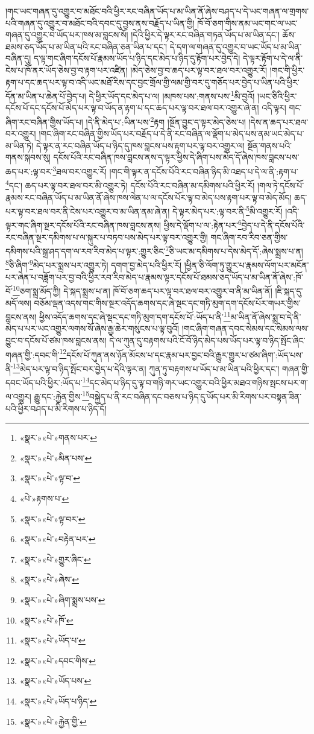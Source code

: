 །གང་ཡང་གཞན་དུ་འགྱུར་བ་མཐོང་བའི་ཕྱིར་རང་བཞིན་ཡོད་པ་མ་ཡིན་ནོ་ཞེས་བཤད་པ་དེ་ཡང་གཞན་ལ་གྲགས་པའི་གཞན་དུ་འགྱུར་བ་མཐོང་བའི་དབང་དུ་བྱས་ནས་བརྗོད་པ་ཡིན་གྱི། ཁོ་བོ་ཅག་གིས་ནམ་ཡང་གང་ལ་ཡང་གཞན་དུ་འགྱུར་བ་ཡོད་པར་ཁས་མ་བླངས་སོ། །དེའི་ཕྱིར་དེ་ལྟར་རང་བཞིན་གཏན་ཡོད་པ་མ་ཡིན་དང་། ཆོས་ཐམས་ཅད་ཡོད་པ་མ་ཡིན་པའི་རང་བཞིན་ཅན་ཡིན་པ་དང་། དེ་དག་ལ་གཞན་དུ་འགྱུར་བ་ཡང་ཡོད་པ་མ་ཡིན་བཞིན་དུ། ད་ལྟ་གང་ཞིག་དངོས་པོ་རྣམས་ཡོད་པ་ཉིད་དང་མེད་པ་ཉིད་དུ་རྟོག་པར་བྱེད་དེ། དེ་ལྟར་རྟོག་པ་དེ་ལ་ནི་ངེས་པ་ཁོ་ནར་ཡོད་ཅེས་བྱ་བ་རྟག་པར་འཛིན། །མེད་ཅེས་བྱ་བ་ཆད་པར་ལྟ་བར་ཐལ་བར་འགྱུར་རོ། །གང་གི་ཕྱིར་རྟག་པ་དང་ཆད་པར་ལྟ་བ་འདི་ཡང་མཐོ་རིས་དང་བྱང་གྲོལ་གྱི་ལམ་གྱི་བར་དུ་གཅོད་པར་བྱེད་པ་ཡིན་པའི་ཕྱིར་དོན་མ་ཡིན་པ་ཆེན་པོ་བྱེད་པ། དེ་ཕྱིར་ཡོད་དང་མེད་པ་ལ། །མཁས་པས་:གནས་པས་\footnote{«སྣར་»«པེ་»གནས་པར་}མི་བྱའོ། །ཡང་ཅིའི་ཕྱིར་དངོས་པོ་དང་དངོས་པོ་མེད་པར་ལྟ་བ་ཡོད་ན་རྟག་པ་དང་ཆད་པར་ལྟ་བར་ཐལ་བར་འགྱུར་ཞེ་ན། འདི་ལྟར། གང་ཞིག་རང་བཞིན་གྱིས་ཡོད་པ། །དེ་ནི་མེད་པ་:ཡིན་པས་\footnote{«སྣར་»«པེ་»མིན་པས་}རྟག །སྔོན་བྱུང་ད་ལྟར་མེད་ཅེས་པ། །དེས་ན་ཆད་པར་ཐལ་བར་འགྱུར། །གང་ཞིག་རང་བཞིན་གྱིས་ཡོད་པར་བརྗོད་པ་དེ་ནི་རང་བཞིན་ལ་ལྡོག་པ་མེད་པས་ནམ་ཡང་མེད་པ་མ་ཡིན་ཏེ། དེ་ལྟར་ན་རང་བཞིན་ཡོད་པ་ཉིད་དུ་ཁས་བླངས་པས་རྟག་པར་ལྟ་བར་འགྱུར་ལ། སྔོན་གནས་པའི་གནས་སྐབས་སུ། དངོས་པོའི་རང་བཞིན་ཁས་བླངས་ནས་ད་ལྟར་ཕྱིས་དེ་ཞིག་པས་མེད་དོ་ཞེས་ཁས་བླངས་པས་ཆད་པར་:ལྟ་བར་\footnote{«སྣར་»«པེ་»ལྟ་བ་}ཐལ་བར་འགྱུར་རོ། །གང་གི་ལྟར་ན་དངོས་པོའི་རང་བཞིན་ཉིད་མི་འཐད་པ་དེ་ལ་ནི་:རྟག་པ་\footnote{«པེ་»རྟགས་པ་}དང་། ཆད་པར་ལྟ་བར་ཐལ་བར་མི་འགྱུར་ཏེ། དངོས་པོའི་རང་བཞིན་མ་དམིགས་པའི་ཕྱིར་རོ། །གལ་ཏེ་དངོས་པོ་རྣམས་རང་བཞིན་ཡོད་པ་མ་ཡིན་ནོ་ཞེས་ཁས་ལེན་པ་ལ་དངོས་པོར་ལྟ་བ་མེད་པས་རྟག་པར་ལྟ་བ་མེད་མོད། ཆད་པར་ལྟ་བར་ཐལ་བར་ནི་ངེས་པར་འགྱུར་བ་མ་ཡིན་ནམ་ཞེ་ན། དེ་ལྟར་མེད་པར་:ལྟ་བར་ནི་\footnote{«སྣར་»«པེ་»ལྟ་བར་}མི་འགྱུར་རོ། །འདི་ལྟར་གང་ཞིག་སྔར་དངོས་པོའི་རང་བཞིན་ཁས་བླངས་ནས། ཕྱིས་དེ་ལྡོག་པ་ལ་:རྟེན་པར་\footnote{«སྣར་»«པེ་»བརྟེན་པར་}བྱེད་པ་དེ་ནི་དངོས་པོའི་རང་བཞིན་སྔར་དམིགས་པ་ལ་སྐུར་པ་བཏབ་པས་མེད་པར་ལྟ་བར་འགྱུར་གྱི། གང་ཞིག་རབ་རིབ་ཅན་གྱིས་དམིགས་པའི་སྐྲ་ཤད་དག་ལ་རབ་རིབ་མེད་པ་ལྟར་:གྱུར་ཅིང་\footnote{«སྣར་»«པེ་»གྱུར་ཞིང་}ཅི་ཡང་མ་དམིགས་པ་དེས་མེད་དོ་:ཞེས་སྨྲས་པ་ན། \footnote{«སྣར་»«པེ་»ཞེས་}ཅི་ཞིག་\footnote{«སྣར་»«པེ་»ཞིག་སྨྲས་པས་}མེད་པར་སྨྲས་པར་འགྱུར་ཏེ། དགག་བྱ་མེད་པའི་ཕྱིར་རོ། །ཕྱིན་ཅི་ལོག་ཏུ་གྱུར་པ་རྣམས་ལོག་པར་མངོན་པར་ཞེན་པ་བཟློག་པར་བྱ་བའི་ཕྱིར་རབ་རིབ་མེད་པ་རྣམས་ལྟར་དངོས་པོ་ཐམས་ཅད་ཡོད་པ་མ་ཡིན་ནོ་ཞེས་:ཁོ་བོ་\footnote{«སྣར་»«པེ་»ཁོ་}ཅག་སྨྲ་མོད་ཀྱི། དེ་སྐད་སྨྲས་པ་ན། ཁོ་བོ་ཅག་ཆད་པར་ལྟ་བར་ཐལ་བར་འགྱུར་བ་ནི་མ་ཡིན་ནོ། །ཇི་སྐད་དུ་མདོ་ལས། བཅོམ་ལྡན་འདས་གང་གིས་སྔར་འདོད་ཆགས་དང་ཞེ་སྡང་དང་གཏི་མུག་དག་དངོས་པོར་གཡར་གྱིས་བླངས་ནས། ཕྱིས་འདོད་ཆགས་དང་ཞེ་སྡང་དང་གཏི་མུག་དག་དངོས་པོ་:ཡོད་པ་ནི་\footnote{«སྣར་»«པེ་»ཡོད་པ་}མ་ཡིན་ནོ་ཞེས་སྨྲ་བ་དེ་ནི་མེད་པ་པར་ཡང་འགྱུར་ལགས་སོ་ཞེས་རྒྱ་ཆེར་གསུངས་པ་ལྟ་བུའོ། །གང་ཞིག་གཞན་དབང་སེམས་དང་སེམས་ལས་བྱུང་བ་དངོས་པོ་ཙམ་ཁས་བླངས་ནས། དེ་ལ་ཀུན་དུ་བརྟགས་པའི་ངོ་བོ་ཉིད་མེད་པས་ཡོད་པར་ལྟ་བ་ཉིད་སྤོང་ཞིང་གཞན་གྱི་:དབང་གི་\footnote{«སྣར་»«པེ་»དབང་གིས་}དངོས་པོ་ཀུན་ནས་ཉོན་མོངས་པ་དང་རྣམ་པར་བྱང་བའི་རྒྱུར་གྱུར་པ་ཙམ་ཞིག་:ཡོད་པས་ནི་\footnote{«སྣར་»«པེ་»ཡོད་པས་}མེད་པར་ལྟ་བ་ཉིད་སྤོང་བར་བྱེད་པ་དེའི་ལྟར་ན། ཀུན་ཏུ་བརྟགས་པ་ཡོད་པ་མ་ཡིན་པའི་ཕྱིར་དང་། གཞན་གྱི་དབང་ཡོད་པའི་ཕྱིར་:ཡོད་པ་\footnote{«སྣར་»«པེ་»ཡོད་པ་ཉིད་}དང་མེད་པ་ཉིད་དུ་ལྟ་བ་གཉི་གར་ཡང་འགྱུར་བའི་ཕྱིར་མཐའ་གཉིས་སྤངས་པར་ག་ལ་འགྱུར། རྒྱུ་དང་:རྐྱེན་གྱིས་\footnote{«སྣར་»«པེ་»རྐྱེན་གྱི་}བསྐྱེད་པ་ནི་རང་བཞིན་དང་བཅས་པ་ཉིད་དུ་ཡོད་པར་མི་རིགས་པར་བསྟན་ཟིན་པའི་ཕྱིར་བཤད་པ་མི་རིགས་པ་ཉིད་དོ། 